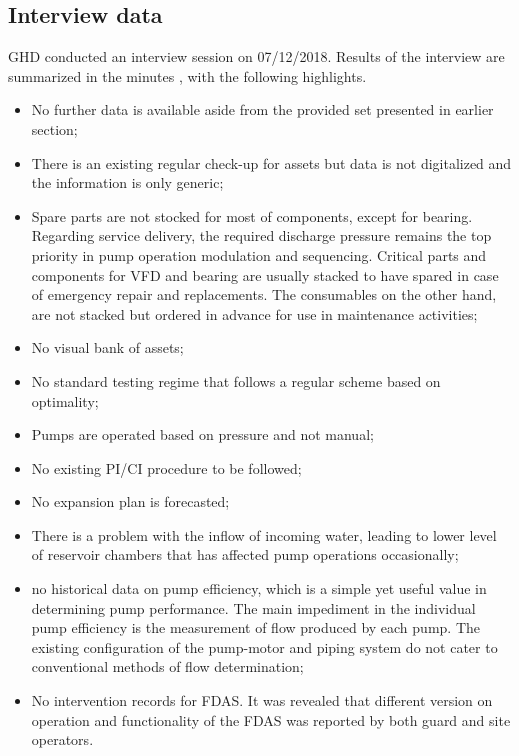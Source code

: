 

\subsection{Interview data}
\label{213}
GHD conducted an interview session on 07/12/2018. Results of the interview are summarized in the minutes \cite{GHD2018l}, with the following highlights.

\begin{itemize}
\item No further data is available aside from the provided set presented in earlier section;
\item There is an existing regular check-up for assets but data is not digitalized and the information is only generic;
\item Spare parts are not stocked for most of components, except for bearing. Regarding service delivery, the required discharge pressure remains the top priority in pump operation modulation and sequencing. Critical parts and components for VFD and bearing are usually stacked to have spared in case of emergency repair and replacements. The consumables on the other hand, are not stacked but ordered in advance for use in maintenance activities;
\item No visual bank of assets;
\item No standard testing regime that follows a regular scheme based on optimality;
\item Pumps are operated based on pressure and not manual;
\item No existing PI/CI procedure to be followed;
\item No expansion plan is forecasted;
\item There is a problem with the inflow of incoming water, leading to lower level of reservoir chambers that has affected pump operations occasionally;
\item no historical data on pump efficiency, which is a simple yet useful value in determining pump performance. The main impediment in  the individual pump efficiency is the measurement of flow produced by each pump. The existing configuration of the pump-motor and piping system do not cater to conventional methods of flow determination;
\item No intervention records for FDAS. It was revealed that different version on operation and functionality of the FDAS was reported by both guard and site operators.
\end{itemize}

